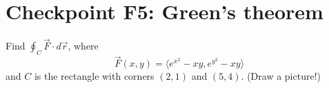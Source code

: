 


%


\allowdisplaybreaks
\section{Checkpoint F5: Green's theorem}

\everymath{\displaystyle}

Find \(\oint_C \vec{F}\cdot d\vec{r}\), where \[\vec{F}(x,y) = \langle e^{x^2} - xy, e^{y^2} - xy \rangle\] and $C$ is the rectangle with corners $(2,1)$ and $(5,4)$. (Draw a picture!)
    
	
